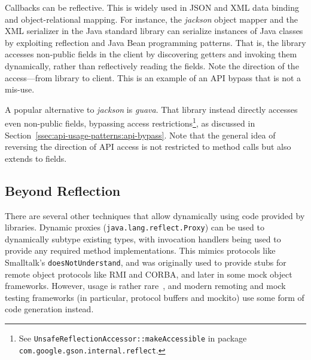 

Callbacks can be reflective. This is widely used in JSON and XML data binding and object-relational mapping. For instance, the \textit{jackson} object mapper and the XML serializer in the Java standard library can serialize instances of Java classes by exploiting reflection and Java Bean programming patterns. That is, the library accesses non-public fields in the client by discovering getters and invoking them dynamically, rather than reflectively reading the fields. Note the direction of the access---from library to client. This is an example of an API bypass that is not a mis-use.


A popular alternative to \textit{jackson} is \textit{guava}. That library instead directly accesses even non-public fields, bypassing access restrictions\footnote{See \texttt{UnsafeReflectionAccessor::makeAccessible} in package \texttt{com.google.gson.internal.reflect}.}, as discussed in Section~\ref{ssec:api-usage-patterns:api-bypass}. Note that the general idea of reversing the direction of API access is not restricted to method calls but also extends to fields.

\subsection{Beyond Reflection}

There are several other techniques that allow dynamically using code provided by libraries. Dynamic proxies (\texttt{java.lang.reflect.Proxy}) can be used to dynamically subtype existing types, with invocation handlers being used to provide any required method implementations.  This mimics protocols like Smalltalk's \texttt{doesNotUnderstand}, and was originally used to provide stubs for remote object protocols like RMI and CORBA, and later in some mock object frameworks. However, usage is rather rare~\cite{dietrich2017xcorpus}, and modern remoting and mock testing frameworks (in particular, protocol buffers and mockito) use some form of code generation instead. 


